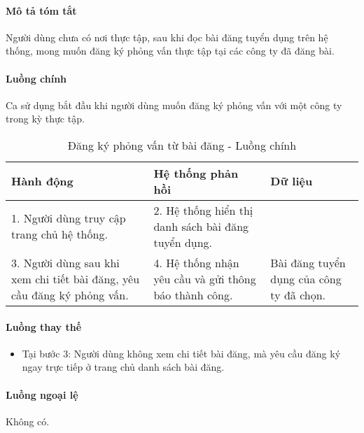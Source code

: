 \documentclass[./../main.tex]{subfiles}
\begin{document}
\paragraph*{Mô tả tóm tắt}

Người dùng chưa có nơi thực tập, sau khi đọc bài đăng tuyển dụng trên hệ
thống, mong muốn đăng ký phỏng vấn thực tập tại các công ty đã đăng bài.

\paragraph*{Luồng chính} Ca sử dụng bắt đầu khi người dùng muốn đăng ký phỏng vấn với một công ty trong kỳ thực tập.

\begin{table}[H]
  \caption{Đăng ký phỏng vấn từ bài đăng - Luồng chính}
  \label{tab:apply_post}
  \begin{tabularx}{\textwidth}{|X|X|X|}
  \hline
  \textbf{Hành động}                                                   & \textbf{Hệ thống phản hồi}                         & \textbf{Dữ liệu}                         \\ \hline
  1. Người dùng truy cập trang chủ hệ thống.                              & 2. Hệ thống hiển thị danh sách bài đăng tuyển dụng.   &                                          \\ \hline
  3. Người dùng sau khi xem chi tiết bài đăng, yêu cầu đăng ký phỏng vấn. & 4. Hệ thống nhận yêu cầu và gửi thông báo thành công. & Bài đăng tuyển dụng của công ty đã chọn. \\ \hline
  \end{tabularx}
\end{table}

\paragraph*{Luồng thay thế}

\begin{itemize}
\item
  
  Tại bước 3: Người dùng không xem chi tiết bài đăng, mà yêu cầu đăng ký
  ngay trực tiếp ở trang chủ danh sách bài đăng.
  
\end{itemize}

\paragraph*{Luồng ngoại lệ} Không có.
\end{document}
